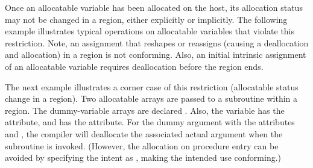 \begin{fortranspecific}[4ex]

Once an allocatable variable has been allocated on the host,
its allocation status may not be changed in a  region, either
explicitly or implicitly. The following example illustrates typical
operations on allocatable variables that violate this restriction.
Note, an assignment that reshapes or reassigns (causing a deallocation
and allocation) in a  region is not conforming.
Also, an initial intrinsic assignment of an allocatable variable 
requires deallocation before the  region ends.


The next example illustrates a corner case of this restriction (allocatable status
change in a  region).
Two allocatable arrays are passed to a subroutine within a 
region. The dummy-variable arrays are declared .
Also, the  variable has the  attribute, and 
has the  attribute. 
For the dummy argument with the attributes  and , 
the compiler will deallocate the associated actual argument when the subroutine is invoked. 
(However, the allocation on procedure entry can be avoided by specifying the intent 
as , making the intended use conforming.)

\end{fortranspecific}
